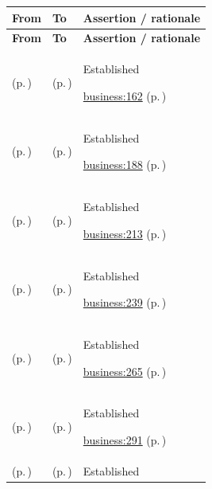 \begin{longtable}{|>{\raggedright\arraybackslash}p{0.27\TableWidth}|>{\raggedright\arraybackslash}p{0.27\TableWidth}|>{\raggedright\arraybackslash}p{0.46\TableWidth}|}
\hline\rowcolor{TableHead}\textbf{From} & \textbf{To} & \textbf{Assertion / rationale}\\\hline\endfirsthead
\hline\rowcolor{TableHead}\textbf{From} & \textbf{To} & \textbf{Assertion / rationale}\\\hline\endhead
\hline\endfoot
\nameref{cap:bc-individual-care-delivery} (p.\,\pageref{cap:bc-individual-care-delivery}) & \nameref{cap:bc-individual-health-assessment} (p.\,\pageref{cap:bc-individual-health-assessment}) & Established

 \hyperref[rad:business:162]{business:162} (p.\,\pageref{rad:business:162})\\\hline
\nameref{cap:bc-individual-care-delivery} (p.\,\pageref{cap:bc-individual-care-delivery}) & \nameref{cap:bc-clinical-determination} (p.\,\pageref{cap:bc-clinical-determination}) & Established

 \hyperref[rad:business:188]{business:188} (p.\,\pageref{rad:business:188})\\\hline
\nameref{cap:bc-individual-care-delivery} (p.\,\pageref{cap:bc-individual-care-delivery}) & \nameref{cap:bc-individual-care-planning} (p.\,\pageref{cap:bc-individual-care-planning}) & Established

 \hyperref[rad:business:213]{business:213} (p.\,\pageref{rad:business:213})\\\hline
\nameref{cap:bc-individual-care-delivery} (p.\,\pageref{cap:bc-individual-care-delivery}) & \nameref{cap:bc-clinical-intervention} (p.\,\pageref{cap:bc-clinical-intervention}) & Established

 \hyperref[rad:business:239]{business:239} (p.\,\pageref{rad:business:239})\\\hline
\nameref{cap:bc-individual-care-delivery} (p.\,\pageref{cap:bc-individual-care-delivery}) & \nameref{cap:bc-individual-health-monitoring} (p.\,\pageref{cap:bc-individual-health-monitoring}) & Established

 \hyperref[rad:business:265]{business:265} (p.\,\pageref{rad:business:265})\\\hline
\nameref{cap:bc-individual-care-delivery} (p.\,\pageref{cap:bc-individual-care-delivery}) & \nameref{cap:bc-individual-care-review} (p.\,\pageref{cap:bc-individual-care-review}) & Established

 \hyperref[rad:business:291]{business:291} (p.\,\pageref{rad:business:291})\\\hline
\nameref{cap:bc-individual-health-assessment} (p.\,\pageref{cap:bc-individual-health-assessment}) & \nameref{cap:bc-health-history-assessment} (p.\,\pageref{cap:bc-health-history-assessment}) & Established


\end{longtable}
